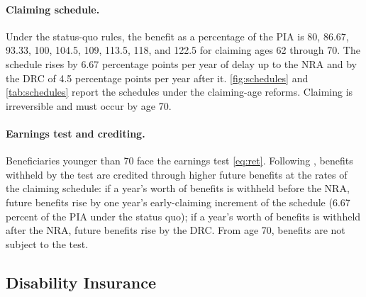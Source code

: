 \paragraph{Claiming schedule.} Under the status-quo rules, the benefit as a percentage of the PIA is 80, 86.67, 93.33, 100, 104.5, 109, 113.5, 118, and 122.5 for claiming ages 62 through 70. The schedule rises by 6.67 percentage points per year of delay up to the NRA and by the DRC of 4.5 percentage points per year after it. \autoref{fig:schedules} and \autoref{tab:schedules} report the schedules under the claiming-age reforms. Claiming is irreversible and must occur by age 70.

\paragraph{Earnings test and crediting.} Beneficiaries younger than 70 face the earnings test \eqref{eq:ret}. Following \citet{french2011effects}, benefits withheld by the test are credited through higher future benefits at the rates of the claiming schedule: if a year's worth of benefits is withheld before the NRA, future benefits rise by one year's early-claiming increment of the schedule (6.67 percent of the PIA under the status quo); if a year's worth of benefits is withheld after the NRA, future benefits rise by the DRC. From age 70, benefits are not subject to the test.

\subsection{Disability Insurance}\label{app:model_di}

